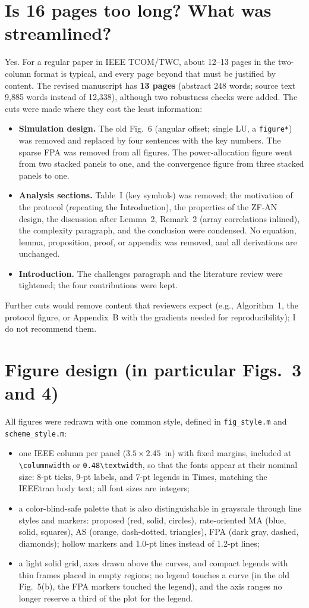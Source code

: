 \documentclass[10pt,a4paper]{article}
\newcommand{\code}[1]{\texttt{#1}}
\begin{document}
\section{Is 16 pages too long? What was streamlined?}\label{sec:q1}
Yes. For a regular paper in IEEE TCOM/TWC, about 12--13 pages in the two-column format is typical, and every page beyond that must be justified by content. The revised manuscript has \textbf{13 pages} (abstract 248 words; source text 9,885 words instead of 12,338), although two robustness checks were added. The cuts were made where they cost the least information:
\begin{itemize}
\item \textbf{Simulation design.} The old Fig.~6 (angular offset; single LU, a \texttt{figure*}) was removed and replaced by four sentences with the key numbers. The sparse FPA was removed from all figures. The power-allocation figure went from two stacked panels to one, and the convergence figure from three stacked panels to one.
\item \textbf{Analysis sections.} Table~I (key symbols) was removed; the motivation of the protocol (repeating the Introduction), the properties of the ZF-AN design, the discussion after Lemma~2, Remark~2 (array correlations inlined), the complexity paragraph, and the conclusion were condensed. No equation, lemma, proposition, proof, or appendix was removed, and all derivations are unchanged.
\item \textbf{Introduction.} The challenges paragraph and the literature review were tightened; the four contributions were kept.
\end{itemize}
Further cuts would remove content that reviewers expect (e.g., Algorithm~1, the protocol figure, or Appendix~B with the gradients needed for reproducibility); I do not recommend them.

\section{Figure design (in particular Figs.~3 and 4)}\label{sec:q2}
All figures were redrawn with one common style, defined in \code{fig\_style.m} and \code{scheme\_style.m}:
\begin{itemize}
\item one IEEE column per panel ($3.5\times2.45$~in) with fixed margins, included at \verb|\columnwidth| or \verb|0.48\textwidth|, so that the fonts appear at their nominal size: 8-pt ticks, 9-pt labels, and 7-pt legends in Times, matching the IEEEtran body text; all font sizes are integers;
\item a color-blind-safe palette that is also distinguishable in grayscale through line styles and markers: proposed (red, solid, circles), rate-oriented MA (blue, solid, squares), AS (orange, dash-dotted, triangles), FPA (dark gray, dashed, diamonds); hollow markers and 1.0-pt lines instead of 1.2-pt lines;
\item a light solid grid, axes drawn above the curves, and compact legends with thin frames placed in empty regions; no legend touches a curve (in the old Fig.~5(b), the FPA markers touched the legend), and the axis ranges no longer reserve a third of the plot for the legend.
\end{itemize}
\end{document}
